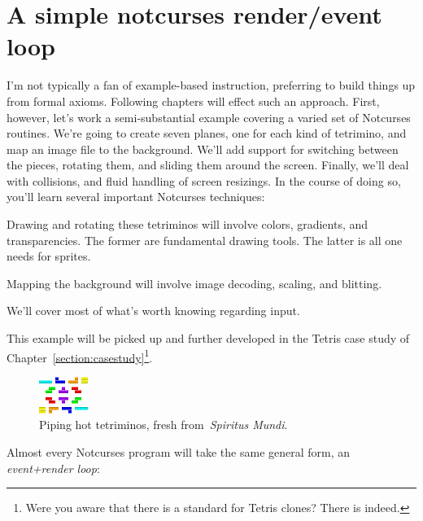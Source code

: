 \section{A simple notcurses render\slash event loop}
I'm not typically a fan of example-based instruction, preferring to build things
up from formal axioms. Following chapters will effect such an approach. First,
however, let's work a semi-substantial example covering a varied set of
Notcurses routines. We're going to create seven planes, one for each kind
of tetrimino, and map an image file to the background. We'll add support for
switching between the pieces, rotating them, and sliding them around the
screen. Finally, we'll deal with collisions, and fluid handling of
screen resizings. In the course of doing so, you'll learn several important
Notcurses techniques:

\begin{denseitemize}
\item{Drawing and rotating these tetriminos will involve colors, gradients, and
      transparencies. The former are fundamental drawing tools. The latter is
      all one needs for sprites.}
\item{Mapping the background will involve image decoding, scaling, and blitting.}
\item{We'll cover most of what's worth knowing regarding input.}
\end{denseitemize}

This example will be picked up and further developed in the Tetris case study
of Chapter~\ref{section:casestudy}\footnote{Were you aware that there is a
standard for Tetris clones? There is indeed\cite{tetris}.}.

\begin{figure}[!htbp]
\centering \includegraphics[width=.5\linewidth]{media/tetriminos.png}
\caption{Piping hot tetriminos, fresh from~\textit{Spiritus Mundi}.}
\label{fig:tetriminos}
\end{figure}

Almost every Notcurses program will take the same general form, an \textit{event+render loop}:

